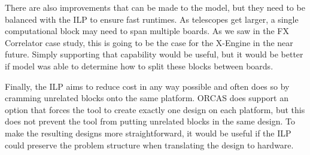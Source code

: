 There are also improvements that can be made to the model, but they need to be balanced with the ILP to ensure fast runtimes.
As telescopes get larger, a single computational block may need to span multiple boards.
As we saw in the FX Correlator case study, this is going to be the case for the X-Engine in the near future.
Simply supporting that capability would be useful, but it would be better if model was able to determine how to split these blocks between boards.

Finally, the ILP aims to reduce cost in any way possible and often does so by cramming unrelated blocks onto the same platform.
ORCAS does support an option that forces the tool to create exactly one design on each platform, but this does not prevent the tool from putting unrelated blocks in the same design.
To make the resulting designs more straightforward, it would be useful if the ILP could preserve the problem structure when translating the design to hardware.


%
%

